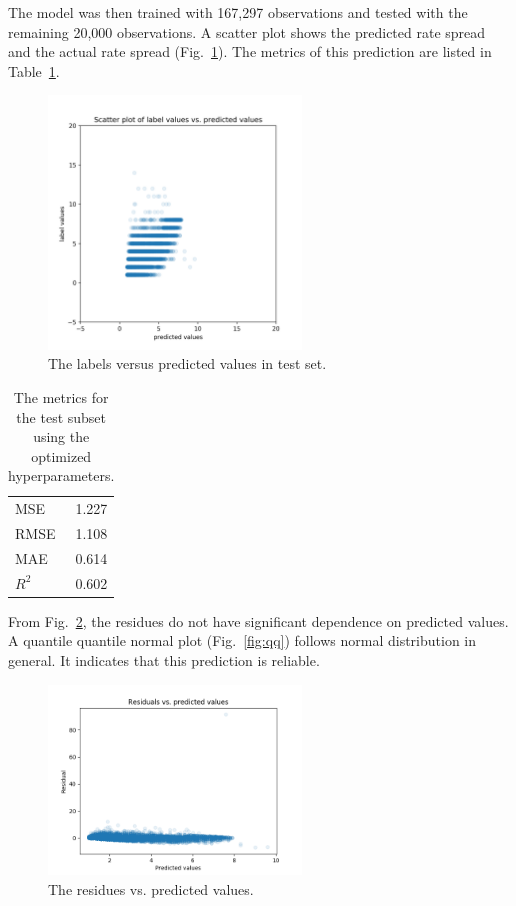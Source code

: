 \documentclass[a4paper,10pt,notitlepage]{article}
\begin{document}
The model was then trained with 167,297 observations and tested with the remaining 20,000 observations. A scatter plot shows the predicted rate spread and the actual rate spread (Fig.~\ref{fig:label_predicted}).
The metrics of this prediction are listed in Table~\ref{tab:metrics}.

\begin{figure}[H]
\centering
\includegraphics[width=0.6\textwidth]{label_predicted.png}
\caption{The labels versus predicted values in test set.}
\label{fig:label_predicted}
\end{figure}

\begin{table}
\centering
\caption{The metrics for the test subset using the optimized hyperparameters.}
\label{tab:metrics}
\begin{tabular}{lr}
\hline \hline
 MSE     &   1.227   \\
 RMSE    &   1.108   \\
 MAE     &   0.614    \\
 $R^2$   &   0.602    \\
\hline
\end{tabular} 
\end{table}

From Fig.~\ref{fig:res_predicted}, 
the residues do not have significant dependence on predicted values.  
A quantile quantile normal plot (Fig.~\ref{fig:qq}) follows normal distribution in general. 
It indicates that this prediction is reliable.


\begin{figure}[H]
\centering
\includegraphics[width=0.6\textwidth]{res_predictedvalues.png}
\caption{The residues vs. predicted values. }
\label{fig:res_predicted}
\end{figure}
\end{document}

